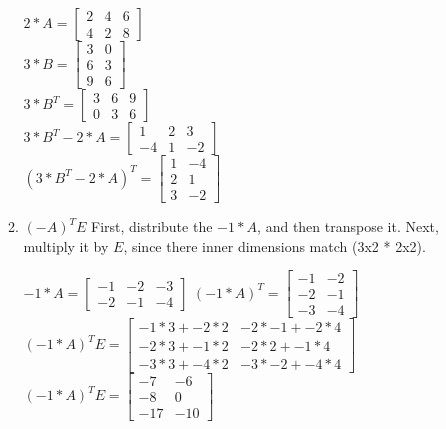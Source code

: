 \documentclass{article}
\begin{document}
\begin{enumerate}
\begin{enumerate}
                \begin{center}
                    $2*A = \begin{bmatrix} 2 & 4& 6\\ 4 & 2 & 8 \end{bmatrix}$\\
                    $3*B = \begin{bmatrix} 3 & 0\\ 6 & 3 \\ 9 & 6 \end{bmatrix}$\\
                    $3*B^T = \begin{bmatrix} 3 & 6 & 9\\ 0 & 3 & 6 \end{bmatrix}$\\
                    $3*B^T - 2*A = \begin{bmatrix} 1 & 2 & 3\\ -4 & 1 & -2 \end{bmatrix}$\\
                    $(3*B^T - 2*A)^T = \begin{bmatrix} 1 & -4 \\ 2 & 1\\ 3 & -2 \end{bmatrix}$\\
                \end{center}
            \item $(-A)^T E$ 
                First, distribute the $-1*A$, and then transpose it. Next, multiply it by $E$, since there inner dimensions match (3x2 * 2x2).\\
                \begin{center}
                    $-1*A = \begin{bmatrix} -1 & -2& -3\\ -2 & -1 & -4 \end{bmatrix}$
                    $(-1*A)^T = \begin{bmatrix} -1 & -2 \\ -2 & -1\\  -3 & -4 \end{bmatrix}$
                    $(-1*A)^T E = \begin{bmatrix} -1*3 + -2*2 & -2*-1  + -2*4\\ -2*3 + -1*2  & -2*2 + -1*4  \\ -3*3 + -4*2 & -3*-2 + -4*4\end{bmatrix}$
                    $(-1*A)^T E = \begin{bmatrix} -7 & -6 \\ -8  & 0  \\ -17 & -10 \end{bmatrix}$

\end{center}
\end{enumerate}
\end{enumerate}
\end{document}
